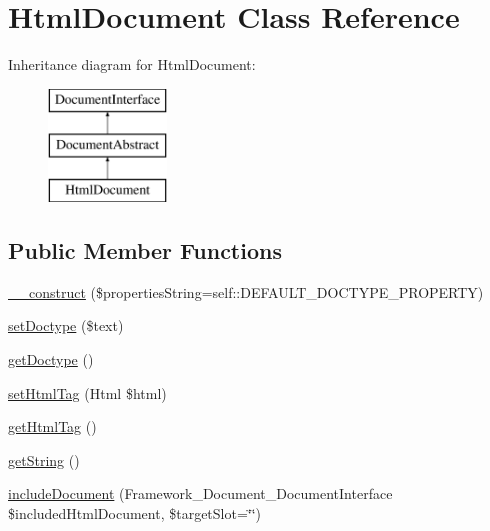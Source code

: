 \hypertarget{class_pes_1_1_document_1_1_html_document}{}\section{Html\+Document Class Reference}
\label{class_pes_1_1_document_1_1_html_document}
Inheritance diagram for Html\+Document\+:\begin{figure}[H]
\begin{center}
\leavevmode
\includegraphics[height=3.000000cm]{class_pes_1_1_document_1_1_html_document}
\end{center}
\end{figure}
\subsection*{Public Member Functions}
\begin{DoxyCompactItemize}
\item 
\mbox{\hyperlink{class_pes_1_1_document_1_1_html_document_a70b3d346ee887e5e64cfb9589f0a4130}{\+\_\+\+\_\+construct}} (\$properties\+String=self\+::\+D\+E\+F\+A\+U\+L\+T\+\_\+\+D\+O\+C\+T\+Y\+P\+E\+\_\+\+P\+R\+O\+P\+E\+R\+TY)
\item 
\mbox{\hyperlink{class_pes_1_1_document_1_1_html_document_aaaabeacc0ec5297805e1d716d54cda6d}{set\+Doctype}} (\$text)
\item 
\mbox{\hyperlink{class_pes_1_1_document_1_1_html_document_a642a5e39c791d840c8deb894ff706b86}{get\+Doctype}} ()
\item 
\mbox{\hyperlink{class_pes_1_1_document_1_1_html_document_a30320351a7d1f6b27b5540877a20ffde}{set\+Html\+Tag}} (Html \$html)
\item 
\mbox{\hyperlink{class_pes_1_1_document_1_1_html_document_a34f9a5311121d8111d87af08d5ea206c}{get\+Html\+Tag}} ()
\item 
\mbox{\hyperlink{class_pes_1_1_document_1_1_html_document_afde980915cc78c408e6ac75b662e631c}{get\+String}} ()
\item 
\mbox{\hyperlink{class_pes_1_1_document_1_1_html_document_aaf106127065467c555cf95ff68ba7ed0}{include\+Document}} (Framework\+\_\+\+Document\+\_\+\+Document\+Interface \$included\+Html\+Document, \$target\+Slot=\char`\"{}\char`\"{})
\end{DoxyCompactItemize}
